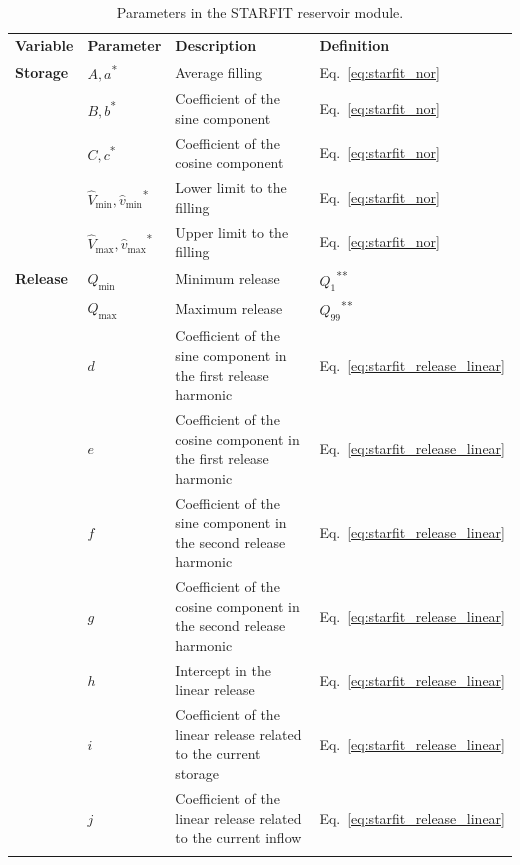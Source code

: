 \documentclass[hess, manuscript]{copernicus}
\begin{document}
\begin{table}[t]
    \centering
    \caption{Parameters in the STARFIT reservoir module.}
    \label{tab:parameters_starfit}
    \begin{tabularx}{\textwidth}{llXl}
        \tophline
        \textbf{Variable} & \textbf{Parameter} & \textbf{Description} & \textbf{Definition} \\
        \middlehline
        \textbf{Storage} & $A, a$\textsuperscript{*} & Average filling & Eq.~\ref{eq:starfit_nor} \\
                         & $B, b$\textsuperscript{*} & Coefficient of the sine component & Eq.~\ref{eq:starfit_nor} \\
                         & $C, c$\textsuperscript{*} & Coefficient of the cosine component & Eq.~\ref{eq:starfit_nor} \\
                         & $\hat{V}_{\min}, \hat{v}_{\min}$\textsuperscript{*} & Lower limit to the filling & Eq.~\ref{eq:starfit_nor} \\
                         & $\hat{V}_{\max}, \hat{v}_{\max}$\textsuperscript{*} & Upper limit to the filling & Eq.~\ref{eq:starfit_nor} \\
        \middlehline
        \textbf{Release} & $Q_{\min}$ & Minimum release & $Q_1$\textsuperscript{**} \\
                         & $Q_{\max}$ & Maximum release & $Q_{99}$\textsuperscript{**} \\
                         & $d$ & Coefficient of the sine component in the first release harmonic & Eq.~\ref{eq:starfit_release_linear} \\
                         & $e$ & Coefficient of the cosine component in the first release harmonic & Eq.~\ref{eq:starfit_release_linear} \\
                         & $f$ & Coefficient of the sine component in the second release harmonic & Eq.~\ref{eq:starfit_release_linear} \\
                         & $g$ & Coefficient of the cosine component in the second release harmonic & Eq.~\ref{eq:starfit_release_linear} \\
                         & $h$ & Intercept in the linear release & Eq.~\ref{eq:starfit_release_linear} \\
                         & $i$ & Coefficient of the linear release related to the current storage & Eq.~\ref{eq:starfit_release_linear} \\
                         & $j$ & Coefficient of the linear release related to the current inflow & Eq.~\ref{eq:starfit_release_linear} \\
         \bottomhline
    \end{tabularx}
\end{table}
\end{document}
